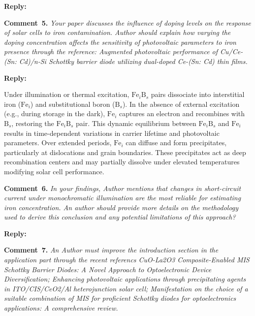 \documentclass[a4paper,fleqn]{cas-sc}
\begin{document}
\noindent
\textcolor[rgb]{0.51,0.00,0.00}{\textbf{Reply:}}




\vspace{1cm}
\noindent
\textcolor[rgb]{0.00,0.50,1.00}{\textbf{Comment~5.}}
\emph{Your paper discusses the influence of doping levels on the response of solar cells to iron contamination. Author should explain how varying the doping concentration affects the sensitivity of photovoltaic parameters to iron presence through the reference:
Augmented photovoltaic performance of Cu/Ce-(Sn: Cd)/n-Si Schottky barrier diode utilizing dual-doped Ce-(Sn: Cd) thin films.}

\noindent
\textcolor[rgb]{0.51,0.00,0.00}{\textbf{Reply:}}


\begin{mdframed}
Under illumination or thermal excitation, $\mathrm{Fe}_i\mathrm{B}_s$ pairs dissociate into interstitial iron ($\mathrm{Fe}_i$) and substitutional boron ($\mathrm{B}_s$). In the absence of external excitation (e.g., during storage in the dark), $\mathrm{Fe}_i$ captures an electron and recombines with $\mathrm{B}_s$, restoring the $\mathrm{Fe}_i\mathrm{B}_s$ pair. This dynamic equilibrium between $\mathrm{Fe}_i\mathrm{B}_s$ and $\mathrm{Fe}_i$ results in time-dependent variations in carrier lifetime and photovoltaic parameters. Over extended periods, $\mathrm{Fe}_i$ can diffuse and form precipitates, particularly at dislocations and grain boundaries. These precipitates act as deep recombination centers and may partially dissolve under elevated temperatures modifying solar cell performance.
\end{mdframed}

\vspace{1cm}
\noindent
\textcolor[rgb]{0.00,0.50,1.00}{\textbf{Comment~6.}}
\emph{In your findings, Author mentions that changes in short-circuit current under monochromatic illumination are the most reliable for estimating iron concentration. An author should provide more details on the methodology used to derive this conclusion and any potential limitations of this approach?}

\noindent
\textcolor[rgb]{0.51,0.00,0.00}{\textbf{Reply:}}




\vspace{1cm}
\noindent
\textcolor[rgb]{0.00,0.50,1.00}{\textbf{Comment~7.}}
\emph{An Author must improve the introduction section in the application part through the recent referencs
CuO-La2O3 Composite-Enabled MIS Schottky Barrier Diodes: A Novel Approach to Optoelectronic Device Diversification; Enhancing photovoltaic applications through precipitating agents in ITO/CIS/CeO2/Al heterojunction solar cell; Manifestation on the choice of a suitable combination of MIS for proficient Schottky diodes for optoelectronics applications: A comprehensive review.}
\end{document}

